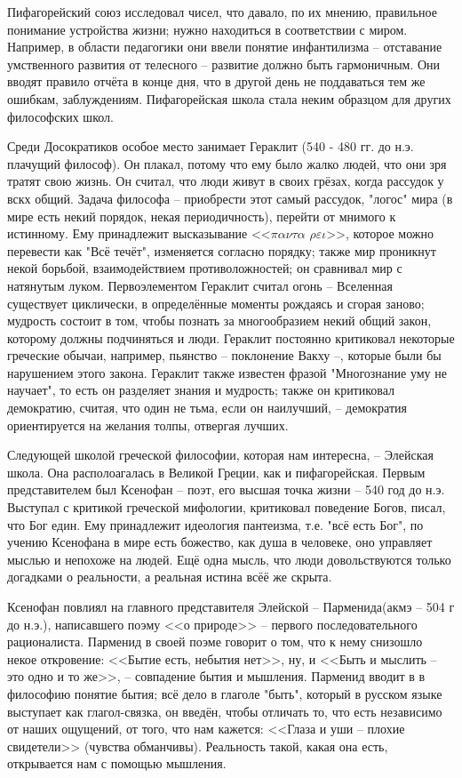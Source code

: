 \documentclass[a4paper, 12pt]{book} %
\begin{document}
Пифагорейский союз исследовал чисел, что давало, по их мнению, правильное понимание устройства жизни; нужно находиться в соответствии с миром. Например, в области педагогики они ввели понятие инфантилизма -- отставание умственного развития от телесного -- развитие должно быть гармоничным. Они вводят правило отчёта в конце дня, что в другой день не поддаваться тем же ошибкам, заблуждениям. Пифагорейская школа стала неким образцом для других философских школ.

Среди Досократиков особое место занимает Гераклит (540 - 480 гг. до н.э. плачущий философ). Он плакал, потому что ему было жалко людей, что они зря тратят свою жизнь. Он считал, что люди живут в своих грёзах, когда рассудок у вскх общий. Задача философа -- приобрести этот самый рассудок, "логос" мира (в мире есть некий порядок, некая периодичность), перейти от мнимого к истинному. Ему принадлежит высказывание <<$\pi \alpha \nu \tau \alpha$ $\rho \varepsilon \iota$>>, которое можно перевести как "Всё течёт", изменяется согласно порядку; также мир проникнут некой борьбой, взаимодействием противоложностей; он сравнивал мир с натянутым луком. Первоэлементом Гераклит считал огонь -- Вселенная существует циклически, в определённые моменты рождаясь и сгорая заново; мудрость состоит в том, чтобы познать за многообразием некий общий закон, которому должны подчиняться и люди. Гераклит постоянно критиковал некоторые греческие обычаи, например, пьянство -- поклонение Вакху --, которые были бы нарушением этого закона. Гераклит также известен фразой "Многознание уму не научает", то есть он разделяет знания и мудрость; также он критиковал демократию, считая, что один не тьма, если он наилучший, -- демократия ориентируется на желания толпы, отвергая лучших.
 
Следующей школой греческой философии, которая нам интересна, -- Элейская школа. Она располоагалась в Великой Греции, как и пифагорейская. Первым представителем был Ксенофан -- поэт, его высшая точка жизни -- 540 год до н.э. Выступал с критикой греческой мифологии, критиковал поведение Богов, писал, что Бог един. Ему принадлежит идеология пантеизма, т.е. "всё есть Бог", по учению Ксенофана в мире есть божество, как душа в человеке, оно управляет мыслью и непохоже на людей. Ещё одна мысль, что люди довольствуются только догадками о реальности, а реальная истина всёё же скрыта. 

Ксенофан повлиял на главного представителя Элейской -- Парменида(акмэ -- 504 г до н.э.), написавшего поэму <<о природе>> -- первого последовательного рационалиста. Парменид в своей поэме говорит о том, что к нему снизошло некое откровение: <<Бытие есть, небытия нет>>, ну, и <<Быть и мыслить -- это одно и то же>>, -- совпадение бытия и мышления. Парменид вводит в в философию понятие бытия; всё дело в глаголе "быть", который  в русском языке выступает как глагол-связка, он введён, чтобы отличать то, что есть независимо от наших ощущений, от того, что нам кажется: <<Глаза и уши -- плохие свидетели>> (чувства обманчивы). Реальность такой, какая она есть, открывается нам с помощью мышления. 
\end{document}
